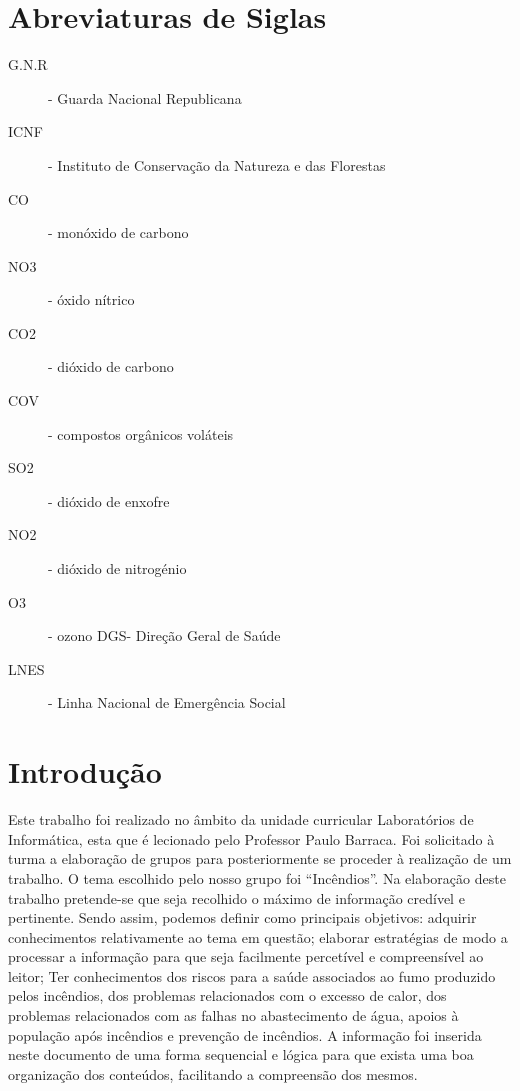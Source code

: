 \documentclass[a4paper,11pt]{report}
\begin{document}
\part{Abreviaturas de Siglas}
 \begin{description}
 \item [G.N.R]- Guarda Nacional Republicana
 \item [ICNF] - Instituto de Conservação da Natureza e das Florestas
 \item [CO] - monóxido de carbono
 \item [NO3] - óxido nítrico
 \item [CO2] - dióxido de carbono
 \item [COV] - compostos orgânicos voláteis
 \item [SO2] - dióxido de enxofre
 \item [NO2] - dióxido de nitrogénio
 \item [O3] - ozono DGS- Direção Geral de Saúde
 \item [LNES] - Linha Nacional de Emergência Social
 \end{description}


\part{Introdução}

Este trabalho foi realizado no âmbito da unidade curricular Laboratórios de Informática, esta que é lecionado pelo Professor Paulo Barraca. Foi solicitado à turma a elaboração de grupos para posteriormente se proceder à realização de um trabalho. O tema escolhido pelo nosso grupo foi “Incêndios”.
Na elaboração deste trabalho pretende-se que seja recolhido o máximo de informação credível e pertinente.
Sendo assim, podemos definir como principais objetivos: adquirir conhecimentos relativamente ao tema em questão; elaborar estratégias de modo a processar a informação para que seja facilmente percetível e compreensível ao leitor; Ter conhecimentos dos riscos para a saúde associados ao fumo produzido pelos incêndios, dos problemas relacionados com o excesso de calor, dos problemas relacionados com as falhas no abastecimento de água, apoios à população após incêndios e prevenção de incêndios.
A informação foi inserida neste documento de uma forma sequencial e lógica para que exista uma boa organização dos conteúdos, facilitando a compreensão dos mesmos.
\end{document}
